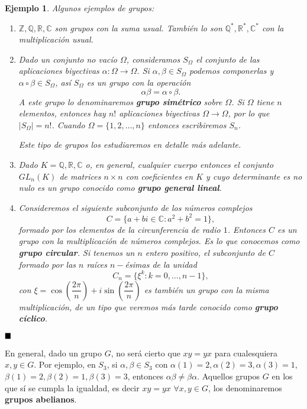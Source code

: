 \documentclass[12pt]{article}
\newtheorem{example}{Ejemplo}[theorem]
\begin{document}
\begin{example} Algunos ejemplos de grupos:
\begin{enumerate}
\item $\mathbb{Z}, \mathbb{Q}, \mathbb{R}, \mathbb{C}$ son grupos con la suma usual. También lo son $\mathbb{Q}^*, \mathbb{R}^*, \mathbb{C}^*$ con la multiplicación usual.
\item Dado un conjunto no vacío $\Omega$, consideramos $S_{\Omega}$ el conjunto de las aplicaciones biyectivas $\alpha \colon \Omega \longrightarrow \Omega$. Si $\alpha, \beta \in S_{\Omega}$ podemos componerlas y $\alpha \circ \beta \in S_{\Omega}$, así $S_{\Omega}$ es un grupo con la operación $$\alpha \beta = \alpha \circ \beta.$$ A este grupo lo denominaremos \textbf{grupo simétrico} sobre $\Omega$. Si $\Omega$ tiene $n$ elementos, entonces hay $n!$ aplicaciones biyectivas $\Omega \longrightarrow \Omega$, por lo que $|S_{\Omega}| = n!$. Cuando $\Omega = \lbrace 1, 2, \ldots, n \rbrace$ entonces escribiremos $S_{n}$.

Este tipo de grupos los estudiaremos en detalle más adelante. 

\item Dado $K = \mathbb{Q}, \mathbb{R}, \mathbb{C}$ o, en general, cualquier cuerpo entonces el conjunto $GL_{n}(K)$ de matrices $n\times n$ con coeficientes en $K$ y cuyo determinante es no nulo es un grupo conocido como \textbf{grupo general lineal}.
\item Consideremos el siguiente subconjunto de los números complejos $$C = \lbrace a+bi \in \mathbb{C}: a^2+b^2 = 1 \rbrace,$$ formado por los elementos de la circunferencia de radio $1$. Entonces $C$ es un grupo con la multiplicación de números complejos. Es lo que conocemos como \textbf{grupo circular}. Si tenemos un $n$ entero positivo, el subconjunto de $C$ formado por las $n$ raíces $n-$ésimas de la unidad $$C_{n}= \lbrace \xi^k : k =0, \ldots, n-1 \rbrace,$$ con $\xi = \cos\left( \dfrac{2\pi}{n} \right) + i\sin\left(\dfrac{2\pi}{n}\right)$ es también un grupo con la misma multiplicación, de un tipo que veremos más tarde conocido como \textbf{grupo cíclico}.
\end{enumerate}
\end{example}
$\hfill \blacksquare$


En general, dado un grupo $G$, no será cierto que $xy = yx$ para cualesquiera $x,y \in G$. Por ejemplo, en $S_{3}$, si $\alpha, \beta \in S_{3}$ con $\alpha(1) = 2, \alpha (2)=3, \alpha (3) = 1$, $\beta (1)=2, \beta(2)=1, \beta (3) = 3$, entonces $\alpha \beta \neq \beta \alpha$. Aquellos grupos $G$ en los que sí se cumpla la igualdad, es decir $xy = yx$ $\forall x,y \in G$, los denominaremos \textbf{grupos abelianos}.
\end{document}
